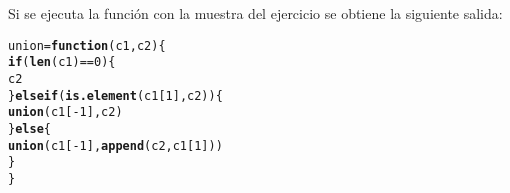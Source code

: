 \documentclass[12pt]{report}\usepackage[]{graphicx}\usepackage[dvipsnames]{xcolor}
\makeatletter
\newcommand{\hlnum}[1]{\textcolor[rgb]{0.686,0.059,0.569}{#1}}%
\newcommand{\hlopt}[1]{\textcolor[rgb]{0,0,0}{#1}}%
\newcommand{\hlstd}[1]{\textcolor[rgb]{0.345,0.345,0.345}{#1}}%
\newcommand{\hlkwa}[1]{\textcolor[rgb]{0.161,0.373,0.58}{\textbf{#1}}}%
\newcommand{\hlkwb}[1]{\textcolor[rgb]{0.69,0.353,0.396}{#1}}%
\newcommand{\hlkwc}[1]{\textcolor[rgb]{0.333,0.667,0.333}{#1}}%
\newcommand{\hlkwd}[1]{\textcolor[rgb]{0.737,0.353,0.396}{\textbf{#1}}}%
\newenvironment{kframe}{%
 \def\at@end@of@kframe{}%
 \ifinner\ifhmode%
  \def\at@end@of@kframe{\end{minipage}}%
  \begin{minipage}{\columnwidth}%
 \fi\fi%
 \def\FrameCommand##1{\hskip\@totalleftmargin \hskip-\fboxsep
 \colorbox{shadecolor}{##1}\hskip-\fboxsep
     \hskip-\linewidth \hskip-\@totalleftmargin \hskip\columnwidth}%
 \MakeFramed {\advance\hsize-\width
   \@totalleftmargin\z@ \linewidth\hsize
   \@setminipage}}%
 {\par\unskip\endMakeFramed%
 \at@end@of@kframe}
\newenvironment{knitrout}{}{} %
\makeatother
\begin{document}
 			Si se ejecuta la función con la muestra del ejercicio se obtiene la siguiente salida:
 			
\begin{knitrout}
\color{fgcolor}\begin{kframe}
\begin{alltt}
\hlstd{union} \hlkwb{=} \hlkwa{function}\hlstd{(}\hlkwc{c1}\hlstd{,} \hlkwc{c2}\hlstd{) \{}
\hlkwa{if} \hlstd{(}\hlkwd{len}\hlstd{(c1)} \hlopt{==} \hlnum{0}\hlstd{) \{}
\hlstd{c2}
\hlstd{\}} \hlkwa{else if} \hlstd{(}\hlkwd{is.element}\hlstd{(c1[}\hlnum{1}\hlstd{], c2)) \{}
\hlkwd{union}\hlstd{(c1[}\hlopt{-}\hlnum{1}\hlstd{], c2)}
\hlstd{\}} \hlkwa{else} \hlstd{\{}
\hlkwd{union}\hlstd{(c1[}\hlopt{-}\hlnum{1}\hlstd{],} \hlkwd{append}\hlstd{(c2, c1[}\hlnum{1}\hlstd{]))}
\hlstd{\}}
\hlstd{\}}


\end{alltt}
\end{kframe}
\end{knitrout}
\end{document}
